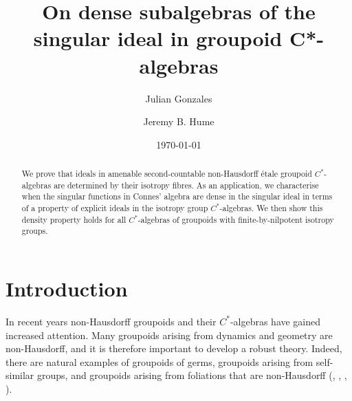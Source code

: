 \documentclass[11pt, oneside, reqno]{amsart}
\theoremstyle{definition}
\theoremstyle{remark}
\numberwithin{equation}{section}
\begin{document}
\date{\today}
\title[On dense subalgebras of the singular ideal in groupoid C*-algebras]{
On dense subalgebras of the singular ideal in groupoid C*-algebras}

\author[Gonzales]{Julian Gonzales}
\address{Julian Gonzales, School of Mathematics and Statistics  \\
University of Glasgow\\ University Place \\ Glasgow \\ G12 8QQ, United Kingdom}

\author[Hume]{Jeremy B. Hume}
\address{Jeremy B. Hume, School of Mathematics and Statistics  \\
Carleton University\\ 4302 Herzberg Laboratories\\ Ottawa, ON\\ K1S 5B6, Canada}

\begin{abstract}
We prove that ideals in amenable second-countable non-Hausdorff \'etale groupoid $C^*$-algebras are determined by their isotropy fibres. As an application, we characterise when the singular functions in Connes' algebra are dense in the singular ideal in terms of a property of explicit ideals in the isotropy group $C^*$-algebras. We then show this density property holds for all $C^*$-algebras of groupoids with finite-by-nilpotent isotropy groups.
\end{abstract}



\maketitle

\vspace{-0.4cm}
\section*{Introduction}

In recent years non-Hausdorff groupoids and their $C^*$-algebras have gained increased attention. Many groupoids arising from dynamics and geometry are non-Hausdorff, and it is therefore important to develop a robust theory. Indeed, there are natural examples of groupoids of germs, groupoids arising from self-similar groups, and groupoids arising from foliations that are non-Hausdorff (\cite{Con82}, \cite{MM03}, \cite{Nek05}, \cite{Nek09}).
\end{document}
